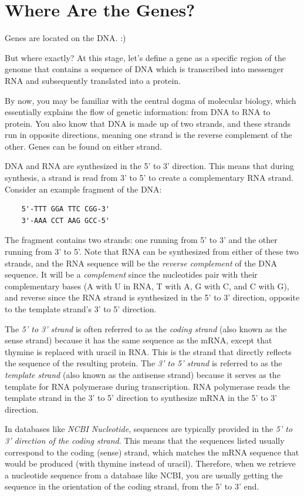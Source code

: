 \chapter{Where Are the Genes?}
\label{ch:genome}

Genes are located on the DNA. :)

But where exactly? At this stage, let's define a gene as a specific region of the genome that contains a sequence of DNA which is transcribed into messenger RNA and subsequently translated into a protein.

By now, you may be familiar with the central dogma of molecular biology, which essentially explains the flow of genetic information: from DNA to RNA to protein. You also know that DNA is made up of two strands, and these strands run in opposite directions, meaning one strand is the reverse complement of the other. Genes can be found on either strand.

DNA and RNA are synthesized in the 5' to 3' direction. This means that during synthesis, a strand is read from 3' to 5' to create a complementary RNA strand. Consider an example fragment of the DNA:

\begin{verbatim}
    5'-TTT GGA TTC CGG-3'
    3'-AAA CCT AAG GCC-5'
\end{verbatim}

The fragment contains two strands: one running from 5' to 3' and the other running from 3' to 5'. Note that RNA can be synthesized from either of these two strands, and the RNA sequence will be the {\em reverse complement} of the DNA sequence. It will be a {\em complement} since the nucleotides pair with their complementary bases (A with U in RNA, T with A, G with C, and C with G), and reverse since the RNA strand is synthesized in the 5' to 3' direction, opposite to the template strand's 3' to 5' direction.

The {\em 5' to 3' strand} is often referred to as the {\em coding strand} (also known as the sense strand) because it has the same sequence as the mRNA, except that thymine is replaced with uracil in RNA. This is the strand that directly reflects the sequence of the resulting protein. The {\em 3' to 5' strand} is referred to as the {\em template strand} (also known as the antisense strand) because it serves as the template for RNA polymerase during transcription. RNA polymerase reads the template strand in the 3' to 5' direction to synthesize mRNA in the 5' to 3' direction.

In databases like {\em NCBI Nucleotide}, sequences are typically provided in the {\em 5' to 3' direction of the coding strand}. This means that the sequences listed usually correspond to the coding (sense) strand, which matches the mRNA sequence that would be produced (with thymine instead of uracil). Therefore, when we retrieve a nucleotide sequence from a database like NCBI, you are usually getting the sequence in the orientation of the coding strand, from the 5' to 3' end.

